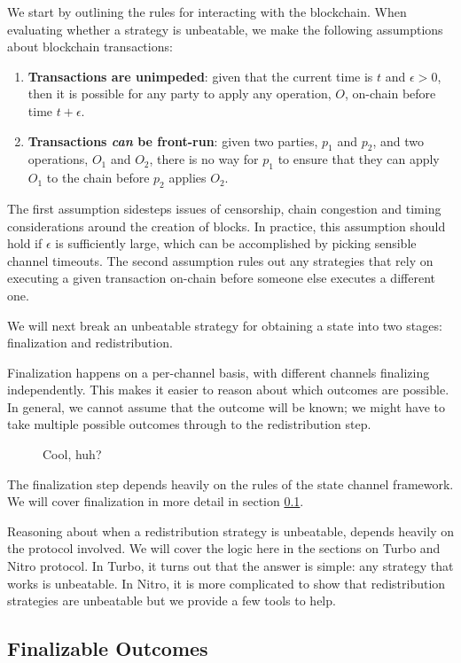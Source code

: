 We start by outlining the rules for interacting with the blockchain.
When evaluating whether a strategy is unbeatable, we make the following assumptions about blockchain transactions:
\begin{enumerate}
  \item \textbf{Transactions are unimpeded}: given that the current time is $t$ and $\epsilon > 0$, then it is possible for any party to apply any operation, $O$, on-chain before time $t + \epsilon$.
  \item \textbf{Transactions \textit{can} be front-run}: given two parties, $p_1$ and $p_2$, and two operations, $O_1$ and $O_2$, there is no way for $p_1$ to ensure that they can apply $O_1$ to the chain before $p_2$ applies $O_2$.
\end{enumerate}
The first assumption sidesteps issues of censorship, chain congestion and timing considerations around the creation of blocks.
In practice, this assumption should hold if $\epsilon$ is sufficiently large, which can be accomplished by picking sensible channel timeouts.
The second assumption rules out any strategies that rely on executing a given transaction on-chain before someone else executes a different one.

We will next break an unbeatable strategy for obtaining a state into two stages: finalization and redistribution. 

Finalization happens on a per-channel basis, with different channels finalizing independently.
This makes it easier to reason about which outcomes are possible.
In general, we cannot assume that the outcome will be known;
we might have to take multiple possible outcomes through to the redistribution step.
\begin{figure}[h]\centering
  \makebox[\textwidth][c]{}
  \caption{Cool, huh?}
\end{figure}
The finalization step depends heavily on the rules of the state channel framework.
We will cover finalization in more detail in section \ref{sec:finalizable-outcomes}.

Reasoning about when a redistribution strategy is unbeatable, depends heavily on the protocol involved. 
We will cover the logic here in the sections on Turbo and Nitro protocol.
In Turbo, it turns out that the answer is simple: any strategy that works is unbeatable.
In Nitro, it is more complicated to show that redistribution strategies are unbeatable but we provide a few tools to help.

\subsection{Finalizable Outcomes}\label{sec:finalizable-outcomes}

